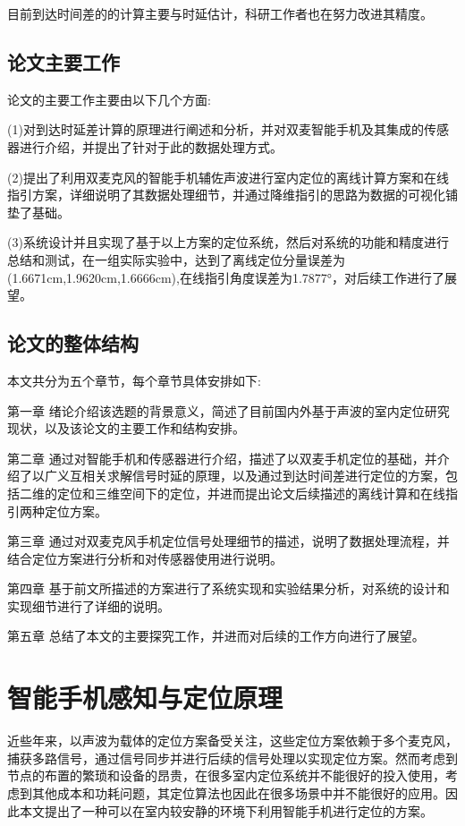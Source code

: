\documentclass[winfonts,oneside]{njuthesis}
\begin{document}
		目前到达时间差的的计算主要与时延估计，科研工作者也在努力改进其精度。

	\section{论文主要工作}

		论文的主要工作主要由以下几个方面:
		
		(1)对到达时延差计算的原理进行阐述和分析，并对双麦智能手机及其集成的传感器进行介绍，并提出了针对于此的数据处理方式。

		(2)提出了利用双麦克风的智能手机辅佐声波进行室内定位的离线计算方案和在线指引方案，详细说明了其数据处理细节，并通过降维指引的思路为数据的可视化铺垫了基础。

		(3)系统设计并且实现了基于以上方案的定位系统，然后对系统的功能和精度进行总结和测试，在一组实际实验中，达到了离线定位分量误差为(1.6671cm,1.9620cm,1.6666cm),在线指引角度误差为1.7877°，对后续工作进行了展望。

	\section{论文的整体结构}
		本文共分为五个章节，每个章节具体安排如下:
		
		第一章 绪论介绍该选题的背景意义，简述了目前国内外基于声波的室内定位研究现状，以及该论文的主要工作和结构安排。
		 
		第二章 通过对智能手机和传感器进行介绍，描述了以双麦手机定位的基础，并介绍了以广义互相关求解信号时延的原理，以及通过到达时间差进行定位的方案，包括二维的定位和三维空间下的定位，并进而提出论文后续描述的离线计算和在线指引两种定位方案。
		
		第三章 通过对双麦克风手机定位信号处理细节的描述，说明了数据处理流程，并结合定位方案进行分析和对传感器使用进行说明。
		
		第四章 基于前文所描述的方案进行了系统实现和实验结果分析，对系统的设计和实现细节进行了详细的说明。
		
		第五章 总结了本文的主要探究工作，并进而对后续的工作方向进行了展望。
		
\chapter{智能手机感知与定位原理}\label{chapter_mobile}
	
	近些年来，以声波为载体的定位方案备受关注，这些定位方案依赖于多个麦克风，捕获多路信号，通过信号同步并进行后续的信号处理以实现定位方案。然而考虑到节点的布置的繁琐和设备的昂贵，在很多室内定位系统并不能很好的投入使用，考虑到其他成本和功耗问题，其定位算法也因此在很多场景中并不能很好的应用。因此本文提出了一种可以在室内较安静的环境下利用智能手机进行定位的方案。
	
\end{document}
